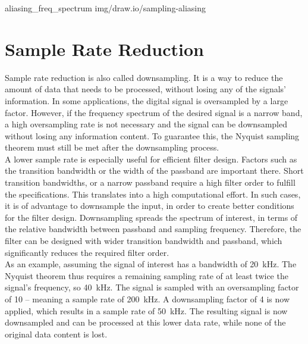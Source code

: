  {aliasing_freq_spectrum} {img/draw.io/sampling-aliasing}

\section{Sample Rate Reduction}

Sample rate reduction is also called downsampling.
It is a way to reduce the amount of data that needs to be processed, without losing any of the signals' information.
In some applications, the digital signal is oversampled by a large factor.
However, if the frequency spectrum of the desired signal is a narrow band, a high oversampling rate is not necessary and the signal can be downsampled without losing any information content.
To guarantee this, the Nyquist sampling theorem must still be met after the downsampling process.\\

A lower sample rate is especially useful for efficient filter design.
Factors such as the transition bandwidth or the width of the passband are important there.
Short transition bandwidths, or a narrow passband require a high filter order to fulfill the specifications.
This translates into a high computational effort.
In such cases, it is of advantage to downsample the input, in order to create better conditions for the filter design.
Downsampling spreads the spectrum of interest, in terms of the relative bandwidth between passband and sampling frequency.
Therefore, the filter can be designed with wider transition bandwidth and passband, which significantly reduces the required filter order.\\

As an example, assuming the signal of interest has a bandwidth of 20~kHz.
The Nyquist theorem thus requires a remaining sampling rate of at least twice the signal's frequency, so 40~kHz.
The signal is sampled with an oversampling factor of 10 -- meaning a sample rate of 200~kHz.
A downsampling factor of 4 is now applied, which results in a sample rate of 50~kHz.
The resulting signal is now downsampled and can be processed at this lower data rate, while none of the original data content is lost.\\

